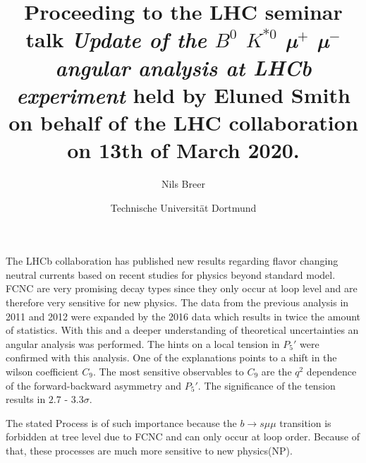 


\setlength{\oddsidemargin}{0.0 cm}
\setlength{\evensidemargin}{0.0 cm}
\setlength{\topmargin}{-1cm}
\setlength{\textheight}{24 cm}
\setlength{\textwidth}{16 cm}

\pagestyle{plain}

\setlength{\parindent}{0in}



\author{Nils Breer}
\date{Technische Universit\"at Dortmund}

\title{Proceeding to the LHC seminar talk \textit{Update of the $B^0$ \to $K^{*0}$ µ$^{+}$ µ$^{-}$ angular analysis at LHCb experiment} held by Eluned Smith on behalf of the LHC collaboration on 13th of March 2020.}

\maketitle

The LHCb collaboration has published new results regarding flavor changing neutral currents based on recent studies for physics beyond standard model. FCNC are very promising decay types since they only occur at loop level and are therefore very sensitive for new physics.
The data from the previous analysis in 2011 and 2012 were expanded by the 2016 data which results in twice the amount of statistics.
With this and a deeper understanding of theoretical uncertainties an angular analysis was performed. The hints on a local tension in $P_5\prime$ were confirmed with this analysis. One of the explanations points to a shift in the wilson coefficient $C_9$.
The most sensitive observables to $C_9$ are the $q^2$ dependence of the forward-backward asymmetry and $P_5\prime$.
The significance of the tension results in $2.7$ - $3.3\sigma$.

The stated Process is of such importance because the
$b \to s \mu \mu$ transition is forbidden at tree level due to FCNC and can only occur at loop order.
Because of that, these processes are much more sensitive to new physics(NP).

%

